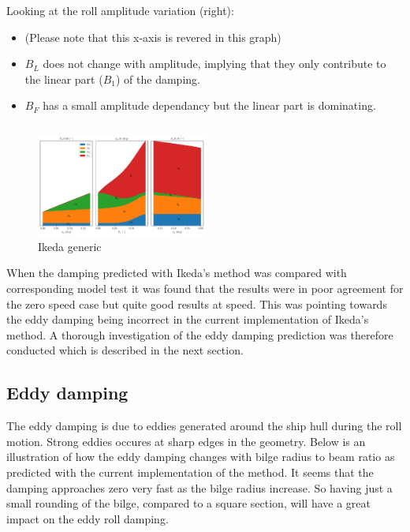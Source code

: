 Looking at the roll amplitude variation (right):

\begin{itemize}
\item (Please note that this x-axis is revered in this graph)
\item $B_L$ does not change with amplitude, implying that they only contribute to the linear part ($B_1$) of the damping.
\item $B_F$ has a small amplitude dependancy but the linear part is dominating.
\end{itemize}

    

    \begin{Verbatim}[commandchars=\\\{\}]

    \end{Verbatim}

    \begin{figure}[H]
        \begin{center}\includegraphics[width = 0.5\textwidth]{figures/ikeda_generic.pdf}\end{center}
        \vspace{-1cm}
        \caption{Ikeda generic}
        \label{fig:ikeda_generic}
    \end{figure}
    
    When the damping predicted with Ikeda's method was compared with
corresponding model test it was found that the results were in poor
agreement for the zero speed case but quite good results at speed. This
was pointing towards the eddy damping being incorrect in the current
implementation of Ikeda's method. A thorough investigation of the eddy
damping prediction was therefore conducted which is described in the
next section.

    \subsection{Eddy damping}\label{eddy-damping}

The eddy damping is due to eddies generated around the ship hull during
the roll motion. Strong eddies occures at sharp edges in the geometry.
Below is an illustration of how the eddy damping changes with bilge
radius to beam ratio as predicted with the current implementation of the
method. It seems that the damping approaches zero very fast as the bilge
radius increase. So having just a small rounding of the bilge, compared
to a square section, will have a great impact on the eddy roll damping.

